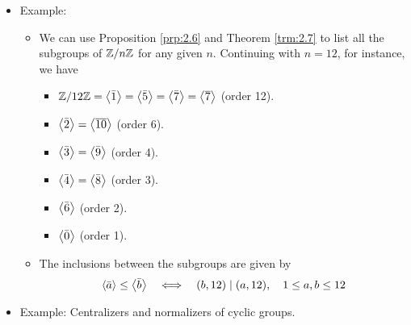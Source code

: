 \documentclass[../notes.tex]{subfiles}
\begin{document}
\begin{itemize}
\begin{theorem}
\begin{enumerate}
        \end{enumerate}
        \begin{proof}
            Given.
        \end{proof}
    \end{theorem}
    \item Example:
    \begin{itemize}
        \item We can use Proposition \ref{prp:2.6} and Theorem \ref{trm:2.7} to list all the subgroups of $\mathbb{Z}/n\mathbb{Z}$ for any given $n$. Continuing with $n=12$, for instance, we have
        \begin{itemize}
            \item $\mathbb{Z}/12\mathbb{Z}=\left\langle{\bar{1}}\right\rangle=\left\langle{\bar{5}}\right\rangle=\left\langle{\bar{7}}\right\rangle=\left\langle{\overline{7}}\right\rangle$ (order 12).
            \item $\left\langle{\bar{2}}\right\rangle=\left\langle{\overline{10}}\right\rangle$ (order 6).
            \item $\left\langle{\bar{3}}\right\rangle=\left\langle{\bar{9}}\right\rangle$ (order 4).
            \item $\left\langle{\bar{4}}\right\rangle=\left\langle{\bar{8}}\right\rangle$ (order 3).
            \item $\left\langle{\bar{6}}\right\rangle$ (order 2).
            \item $\left\langle{\bar{0}}\right\rangle$ (order 1).
        \end{itemize}
        \item The inclusions between the subgroups are given by
        \begin{equation*}
            \left\langle{\bar{a}}\right\rangle \leq \left\langle{\bar{b}}\right\rangle
            \quad\Longleftrightarrow\quad
            (b,12)\mid(a,12)
            ,\quad
            1\leq a,b\leq 12
        \end{equation*}
    \end{itemize}
    \item Example: Centralizers and normalizers of cyclic groups.
\end{itemize}
\end{document}
